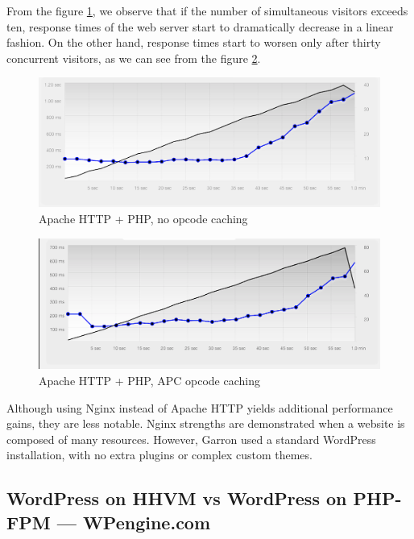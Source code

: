 From the figure \ref{fig:garron-no-cache}, we observe that if the number of simultaneous visitors exceeds ten, response times of the web server start to dramatically decrease in a linear fashion. On the other hand, response times start to worsen only after thirty concurrent visitors, as we can see from the figure \ref{fig:garron-apc-cache}.

\begin{figure}[H]
\begin{center}
\includegraphics[scale=0.5]{figures/garron-no-cache.png}
\caption{Apache HTTP + PHP, no opcode caching}
\label{fig:garron-no-cache}
\end{center}
\end{figure}

\begin{figure}[H]
\begin{center}
\includegraphics[scale=0.5]{figures/garron-apc-cache.png}
\caption{Apache HTTP + PHP, APC opcode caching}
\label{fig:garron-apc-cache}
\end{center}
\end{figure}

Although using Nginx instead of Apache HTTP yields additional performance gains, they are less notable. Nginx strengths are demonstrated when a website is composed of many resources. However, Garron used a standard WordPress installation, with no extra plugins or complex custom themes.

\subsection{WordPress on HHVM vs WordPress on PHP-FPM — WPengine.com}
\label{sec:WPengine-study}

